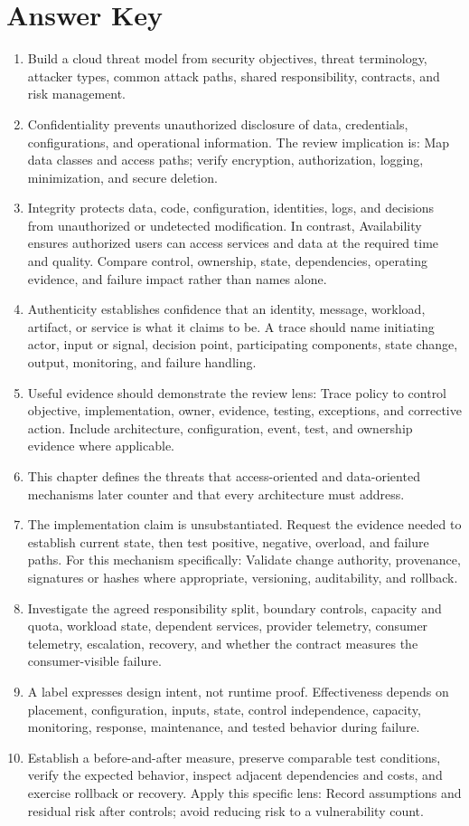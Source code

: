 \documentclass[11pt]{article}
\begin{document}
\section{Answer Key}
\begin{enumerate}
\item Build a cloud threat model from security objectives, threat terminology, attacker types, common attack paths, shared responsibility, contracts, and risk management.
\item Confidentiality prevents unauthorized disclosure of data, credentials, configurations, and operational information. The review implication is: Map data classes and access paths; verify encryption, authorization, logging, minimization, and secure deletion.
\item Integrity protects data, code, configuration, identities, logs, and decisions from unauthorized or undetected modification. In contrast, Availability ensures authorized users can access services and data at the required time and quality. Compare control, ownership, state, dependencies, operating evidence, and failure impact rather than names alone.
\item Authenticity establishes confidence that an identity, message, workload, artifact, or service is what it claims to be. A trace should name initiating actor, input or signal, decision point, participating components, state change, output, monitoring, and failure handling.
\item Useful evidence should demonstrate the review lens: Trace policy to control objective, implementation, owner, evidence, testing, exceptions, and corrective action. Include architecture, configuration, event, test, and ownership evidence where applicable.
\item This chapter defines the threats that access-oriented and data-oriented mechanisms later counter and that every architecture must address.
\item The implementation claim is unsubstantiated. Request the evidence needed to establish current state, then test positive, negative, overload, and failure paths. For this mechanism specifically: Validate change authority, provenance, signatures or hashes where appropriate, versioning, auditability, and rollback.
\item Investigate the agreed responsibility split, boundary controls, capacity and quota, workload state, dependent services, provider telemetry, consumer telemetry, escalation, recovery, and whether the contract measures the consumer-visible failure.
\item A label expresses design intent, not runtime proof. Effectiveness depends on placement, configuration, inputs, state, control independence, capacity, monitoring, response, maintenance, and tested behavior during failure.
\item Establish a before-and-after measure, preserve comparable test conditions, verify the expected behavior, inspect adjacent dependencies and costs, and exercise rollback or recovery. Apply this specific lens: Record assumptions and residual risk after controls; avoid reducing risk to a vulnerability count.
\end{enumerate}
\end{document}
